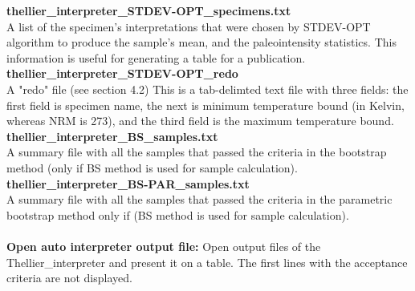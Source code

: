 \documentclass[12pt]{article}
\begin{document}
{\bf thellier\_interpreter\_STDEV-OPT\_specimens.txt}\\
A list of the specimen's interpretations that were chosen by STDEV-OPT algorithm to produce the sample's mean, and the paleointensity statistics. This information is useful for generating a table for a publication.\\
{\bf thellier\_interpreter\_STDEV-OPT\_redo}\\
A "redo" file (see section 4.2) This is a tab-delimted text file with three fields: the first field is specimen name, the next is minimum temperature bound (in Kelvin, whereas NRM is 273), and the third field is the maximum temperature bound. \\
{\bf thellier\_interpreter\_BS\_samples.txt}\\
A summary file with all the samples that passed the criteria in the bootstrap method (only if BS method is used for sample calculation).\\
{\bf thellier\_interpreter\_BS-PAR\_samples.txt}\\
A summary file with all the samples that passed the criteria in the parametric bootstrap method only if (BS method is used for sample calculation).\\
\\
{\bf Open auto interpreter output file:}  Open output files of the Thellier\_interpreter and present it on a table. The first lines with the acceptance criteria are not displayed.\\
\end{document}
